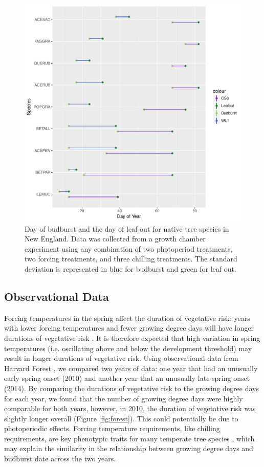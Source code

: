 \documentclass{article}\usepackage[]{graphicx}\usepackage[]{color}
\makeatletter
\def\maxwidth{ %
  \ifdim\Gin@nat@width>\linewidth
    \linewidth
  \else
    \Gin@nat@width
  \fi
}
\makeatother
\begin{document}
\begin{figure}[H]
\includegraphics[width=\maxwidth]{figure/dan-1} \caption[Day of budburst and the day of leaf out for native tree species in New England]{Day of budburst and the day of leaf out for native tree species in New England. Data was collected from a growth chamber experiment using any combination of two photoperiod treatments, two forcing treatments, and three chilling treatments. The standard deviation is represented in blue for budburst and green for leaf out.}\label{fig:dan}
\end{figure}




\subsection*{Observational Data} %
Forcing temperatures in the spring affect the duration of vegetative risk: years with lower forcing temperatures and fewer growing degree days will have longer durations of vegetative risk \citep{Donnelly2017}. It is therefore expected that high variation in spring temperatures (i.e. oscillating above and below the development threshold) may result in longer durations of vegetative risk. Using observational data from Harvard Forest \citep{Okeefe2014}, we compared two years of data: one year that had an unusually early spring onset (2010) and another year that an unusually late spring onset (2014). By comparing the durations of vegetative risk to the growing degree days for each year, we found that the number of growing degree days were highly comparable for both years, however, in 2010, the duration of vegetative risk was slightly longer overall (Figure \ref{fig:forest}). This could potentially be due to photoperiodic effects. Forcing temperature requirements, like chilling requirements, are key phenotypic traits for many temperate tree species \citep{Kramer2017}, which may explain the similarity in the relationship between growing degree days and budburst date across the two years.
\end{document}
